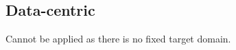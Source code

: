 \subsection{Data-centric}
Cannot be applied as there is no fixed target domain. 
















































































































